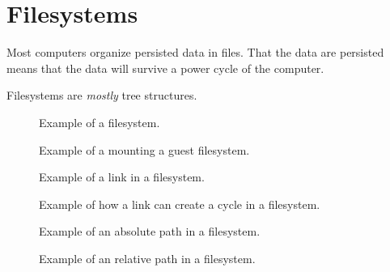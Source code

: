 \section{Filesystems}

Most computers organize persisted data in files. That the data are persisted means that the data will survive a power cycle of the computer.

Filesystems are \textsl{mostly} tree structures.

\begin{figure}[tbp]
  
  \caption{Example of a filesystem.}
  \label{fig:bs:fs}
\end{figure}

\begin{figure}[tbp]
  
  \caption{Example of a mounting a guest filesystem.}
  \label{fig:bs:fs:mounting}
\end{figure}

\begin{figure}[tbp]
  
  \caption{Example of a link in a filesystem.}
  \label{fig:bs:fs:links}
\end{figure}

\begin{figure}[tbp]
  
  \caption{Example of how a link can create a cycle in a filesystem.}
  \label{fig:bs:fs:cycles}
\end{figure}

\begin{figure}[tbp]
  
  \caption{Example of an absolute path in a filesystem.}
  \label{fig:bs:fs:path:abs}
\end{figure}

\begin{figure}[tbp]
  
  \caption{Example of an relative path in a filesystem.}
  \label{fig:bs:fs:path:rel}
\end{figure}

